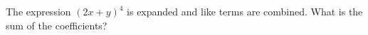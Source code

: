 The expression $(2x+y)^4$ is expanded and like terms are combined. What is the sum of the coefficients?
